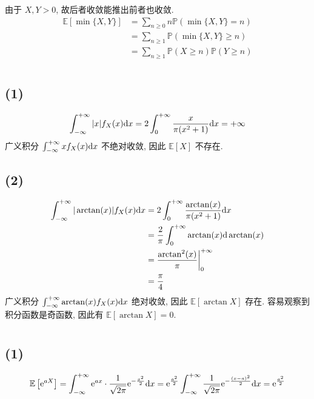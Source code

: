 \documentclass[8pt]{article}
\theoremstyle{compact}
\def\ge{\geqslant}
\def\P#1{\mathbb{P}\left({#1}\right)}
\def\e{\mathrm{e}}
\def\E#1{\mathbb{E}\left[{#1}\right]}
\begin{document}
由于 $X, Y > 0$, 故后者收敛能推出前者也收敛.
\begin{equation*}
	\begin{split}
		\E{\min\{X, Y\}} &= \sum_{n \ge 0}n\P{\min\{X, Y\} = n}\\
		&= \sum_{n \ge 1}\P{\min\{X, Y\} \ge n}\\
		&= \sum_{n \ge 1}\P{X \ge n}\P{Y \ge n}
	\end{split}
\end{equation*}
\section{}\subsection*{(1)}
\begin{equation*}
	\int_{-\infty}^{+\infty}|x|f_X(x)\text dx = 2\int_{0}^{+\infty}\frac{x}{\pi(x^2+1)}\text dx = +\infty
\end{equation*}
广义积分 $\int_{-\infty}^{+\infty}xf_X(x)\text dx$ 不绝对收敛, 因此 $\E{X}$ 不存在.
\subsection*{(2)} \begin{equation*}
\begin{split}
	\int_{-\infty}^{+\infty}|\arctan (x)|f_X(x)\text dx &= 2\int_{0}^{+\infty}\frac{\arctan(x)}{\pi(x^2+1)}\text dx\\
	&= \frac{2}{\pi}\int_{0}^{+\infty}\arctan(x) \text d \arctan(x)\\
	&= \frac{\arctan^2(x)}{\pi}\bigg|_{0}^{+\infty}\\
	&= \frac{\pi}{4}
\end{split}
\end{equation*}
广义积分 $\int_{-\infty}^{+\infty}\arctan(x)f_X(x)\text dx$ 绝对收敛, 因此 $\E{\arctan X}$ 存在. 容易观察到积分函数是奇函数, 因此有 $\E{\arctan X} = 0$.
\section{}
\subsection*{(1)}
\begin{equation*}
	\E{\e^{aX}} = \int_{-\infty}^{+\infty}\e^{ax}\cdot\frac{1}{\sqrt{2\pi}}\e^{-\frac{x^2}{2}}\text dx = \e^{\frac{a^2}{2}}\int_{-\infty}^{+\infty}\frac{1}{\sqrt{2\pi}}\e^{-\frac{(x-a)^2}{2}}\text dx = \e^{\frac{a^2}{2}}
\end{equation*}
\end{document}
